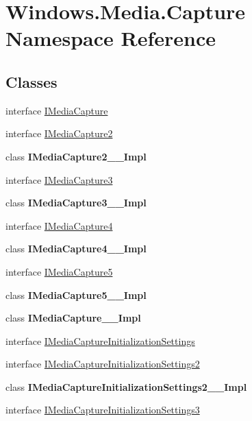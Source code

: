\hypertarget{namespace_windows_1_1_media_1_1_capture}{}\section{Windows.\+Media.\+Capture Namespace Reference}
\label{namespace_windows_1_1_media_1_1_capture}
\subsection*{Classes}
\begin{DoxyCompactItemize}
\item 
interface \hyperlink{interface_windows_1_1_media_1_1_capture_1_1_i_media_capture}{I\+Media\+Capture}
\item 
interface \hyperlink{interface_windows_1_1_media_1_1_capture_1_1_i_media_capture2}{I\+Media\+Capture2}
\item 
class {\bfseries I\+Media\+Capture2\+\_\+\+\_\+\+Impl}
\item 
interface \hyperlink{interface_windows_1_1_media_1_1_capture_1_1_i_media_capture3}{I\+Media\+Capture3}
\item 
class {\bfseries I\+Media\+Capture3\+\_\+\+\_\+\+Impl}
\item 
interface \hyperlink{interface_windows_1_1_media_1_1_capture_1_1_i_media_capture4}{I\+Media\+Capture4}
\item 
class {\bfseries I\+Media\+Capture4\+\_\+\+\_\+\+Impl}
\item 
interface \hyperlink{interface_windows_1_1_media_1_1_capture_1_1_i_media_capture5}{I\+Media\+Capture5}
\item 
class {\bfseries I\+Media\+Capture5\+\_\+\+\_\+\+Impl}
\item 
class {\bfseries I\+Media\+Capture\+\_\+\+\_\+\+Impl}
\item 
interface \hyperlink{interface_windows_1_1_media_1_1_capture_1_1_i_media_capture_initialization_settings}{I\+Media\+Capture\+Initialization\+Settings}
\item 
interface \hyperlink{interface_windows_1_1_media_1_1_capture_1_1_i_media_capture_initialization_settings2}{I\+Media\+Capture\+Initialization\+Settings2}
\item 
class {\bfseries I\+Media\+Capture\+Initialization\+Settings2\+\_\+\+\_\+\+Impl}
\item 
interface \hyperlink{interface_windows_1_1_media_1_1_capture_1_1_i_media_capture_initialization_settings3}{I\+Media\+Capture\+Initialization\+Settings3}

\end{DoxyCompactItemize}
